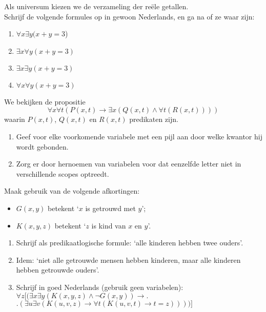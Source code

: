 \begin{exercise}
Als universum kiezen we de verzameling der re\"ele getallen. \\
Schrijf de volgende formules op in gewoon Nederlands, en ga na of ze waar zijn:
\begin{enumerate}[label=\arabic*.]
    \item $\forall x\exists y(x+y=3$)
    \item $\exists x\forall y(x+y=3)$
    \item $\exists x\exists y(x+y=3)$
    \item $\forall x\forall y(x+y=3)$
\end{enumerate}
\end{exercise}

\begin{exercise}
We bekijken de propositie
$$\forall x\forall t(P(x,t)\rightarrow\exists x(Q(x,t)\wedge\forall t(R(x,t))))$$
waarin $P(x,t)$, $Q(x,t)$ en $R(x,t)$ predikaten zijn.
\begin{enumerate}[label=\arabic*.]
    \item Geef voor elke voorkomende variabele met een pijl aan door welke kwantor hij wordt gebonden.
    \item Zorg er door hernoemen van variabelen voor dat eenzelfde letter niet in verschillende scopes optreedt.
\end{enumerate}
\end{exercise}

\begin{exercise}
Maak gebruik van de volgende afkortingen:
\begin{itemize}
  \item $G(x,y)$ betekent `$x$ is getrouwd met $y$';
  \item $K(x, y, z)$ betekent `$z$ is kind van $x$ en $y$'.
\end{itemize}
\begin{enumerate}[label=\arabic*.]
    \item Schrijf als predikaatlogische formule: `alle kinderen hebben twee ouders'.
    \item Idem: `niet alle getrouwde mensen hebben kinderen, maar alle kinderen hebben getrouwde ouders'.
    \item Schrijf in goed Nederlands (gebruik geen variabelen):\\
    $\forall z\bigl[(\exists x\exists y(K(x, y, z)\wedge\neg G(x,y))\rightarrow\bigr.$\\
    \null\hfill$\bigl.(\exists u\exists v(K(u,v,z)\rightarrow\forall t(K(u,v,t)\rightarrow t=z))))\bigr]$
\end{enumerate}
\end{exercise}


